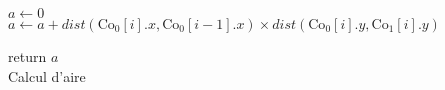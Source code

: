 \documentclass{article}
\begin{document}
\begin{algorithm}[H]
	
	\smallbreak
	
	
	
	
	$a \leftarrow 0$\\
	{
		$a \leftarrow a + dist(\textrm{Co}_\textrm{0}[i].x, \textrm{Co}_\textrm{0}[i-1].x) \times dist(\textrm{Co}_\textrm{0}[i].y, \textrm{Co}_\textrm{1}[i].y)$\\
	}

	return $a$\\
	
	\caption{Calcul d'aire}
\end{algorithm}
    
    
\end{document}
